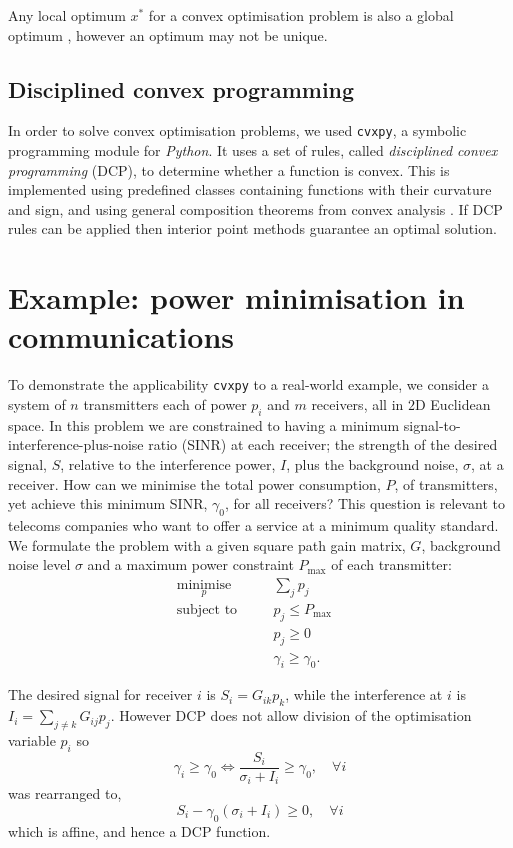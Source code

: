 \documentclass[twocolumn,secnumarabic,amssymb, nobibnotes, aps, prl,superscriptaddress]{revtex4-1}
\begin{document}
Any local optimum $x^*$ for a convex optimisation problem is also a global optimum \cite[pp.138-139]{cvxpybook}, however an optimum may not be unique.

\subsection{Disciplined convex programming}
\noindent In order to solve convex optimisation problems, we used \texttt{cvxpy}, a symbolic programming module for \textit{Python}\cite{cvxpy}. It uses a set of rules, called \textit{disciplined convex programming} (DCP), to determine whether a function is convex. This is implemented using predefined classes containing functions with their curvature and sign, and using general composition theorems from convex analysis \cite{dcp}. If DCP rules can be applied then interior point methods guarantee an optimal solution.

\section{Example: power minimisation in communications}
\noindent To demonstrate the applicability \texttt{cvxpy} to  a real-world example, we consider a system of $n$ transmitters each of power $p_i$ and $m$ receivers, all in $2$D Euclidean space\cite{shannon1949}. In this problem we are constrained to having a minimum signal-to-interference-plus-noise ratio (SINR) at each receiver; the strength of the desired signal, $S$, relative to the interference power, $I$, plus the background noise, $\sigma$, at a receiver. How can we minimise the total power consumption, $P$, of transmitters, yet achieve this minimum SINR, $\gamma_0$, for all receivers? This question is relevant to telecoms companies who want to offer a service at a minimum quality standard. We formulate the problem with a given square path gain matrix, $G$, background noise level $\sigma$ and a maximum power constraint $P_{\text{max}}$ of each transmitter:
\begin{align*}
&\underset{p}{\text{minimise}} \quad &&\sum_j p_j\\
&\text{subject to} \quad &&p_j \leq P_{\max}\\
& \quad &&p_j \geq 0\\
& \quad &&\gamma_i \geq \gamma_0.&&
\end{align*}

The desired signal for receiver $i$ is $S_i = G_{ik}p_k$, while the interference at $i$ is $I_i = \sum_{j\neq k}G_{ij}p_j$. However DCP does not allow division of the optimisation variable $p_i$ so  
\begin{equation*}
  \gamma_i \geq \gamma_0\Longleftrightarrow  \frac{S_i}{\sigma_i + I_i}\geq \gamma_0, \quad \forall i
\end{equation*}
was rearranged to,
\begin{equation*}
S_i-\gamma_0(\sigma_i + I_i)\geq 0, \quad \forall i
\end{equation*} which is affine, and hence a DCP function.
\end{document}
